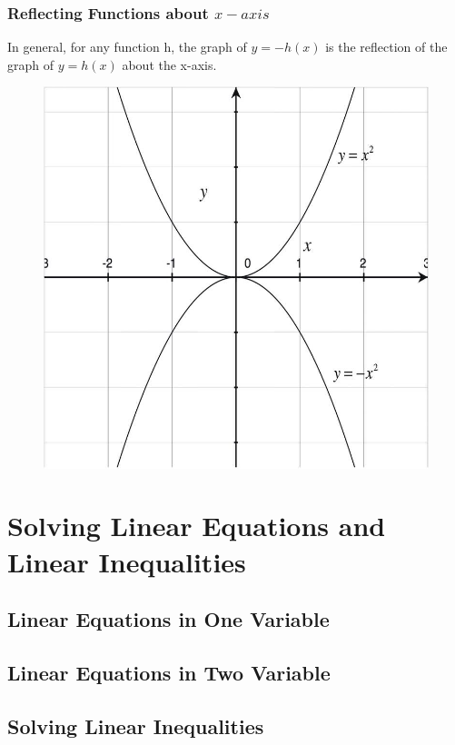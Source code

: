 \documentclass[
	11pt, %
	handout,
]{beamer}
\begin{document}

\begin{frame}
	\frametitle{Reflecting Functions about $x-axis$}
	\begin{theorem}[函数右边加负号]
	In general, for any function h, the graph of $y = −h(x)$ is the reflection of the graph of $y = h(x)$ about the x-axis.
	\end{theorem}

	\begin{figure}
		\includegraphics[width=0.5\linewidth]{Reflection2.jpeg} 
	\end{figure}

\end{frame}



\section{Solving Linear Equations and Linear Inequalities}


\subsection{Linear Equations in One Variable}


\subsection{Linear Equations in Two Variable}


\subsection{Solving Linear Inequalities}
\end{document}
